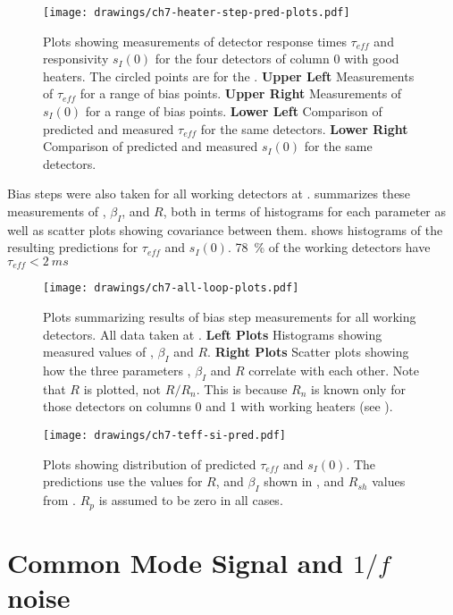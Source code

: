 \begin{figure*}
  \centering
\texttt{[image: drawings/ch7-heater-step-pred-plots.pdf]}
\caption{%
  Plots showing measurements of detector response times $\tau_{eff}$ and responsivity $s_I(0)$ for the four detectors of column 0 with good heaters.
  The circled points are for the \SOC.
\textbf{Upper Left}
Measurements of $\tau_{eff}$ for a range of bias points.
\textbf{Upper Right}
Measurements of $s_I(0)$ for a range of bias points.
\textbf{Lower Left}
Comparison of predicted and measured $\tau_{eff}$ for the same detectors.
\textbf{Lower Right}
Comparison of predicted and measured $s_I(0)$ for the same detectors.
}
\label{fig:ch7-heater-step-pred-plots}
\end{figure*}

Bias steps were also taken for all working detectors at \SOC.
 summarizes these measurements of \Loop, $\beta_I$, and $R$, both in terms of histograms for each parameter as well as scatter plots showing covariance between them.
 shows histograms of the resulting predictions for $\tau_{eff}$ and $s_I(0)$.
\SI{78}{\percent} of the working detectors have $\tau_{eff} < \SI{2}{ms}$

\begin{figure*}
  \centering
\texttt{[image: drawings/ch7-all-loop-plots.pdf]}
\caption{
  Plots summarizing results of bias step measurements for all working detectors.
All data taken at \SOC.
\textbf{Left Plots}
Histograms showing measured values of \Loop, $\beta_I$ and $R$.
\textbf{Right Plots}
Scatter plots showing how the three parameters \Loop, $\beta_I$ and $R$ correlate with each other.
Note that $R$ is plotted, not $R/R_n$. This is because $R_n$ is known only for those detectors on columns 0 and 1 with working heaters (see ).
}
\label{fig:ch7-all-loop-plots}
\end{figure*}

\begin{figure*}
  \centering
\texttt{[image: drawings/ch7-teff-si-pred.pdf]}
\caption{
  Plots showing distribution of predicted $\tau_{eff}$ and $s_I(0)$. The predictions use the values for $R$, \Loop and $\beta_I$ shown in , and $R_{sh}$ values from . $R_p$ is assumed to be zero in all cases.
}
\label{fig:ch7-teff-si-pred}
\end{figure*}

\section{Common Mode Signal and $1/f$ noise}


